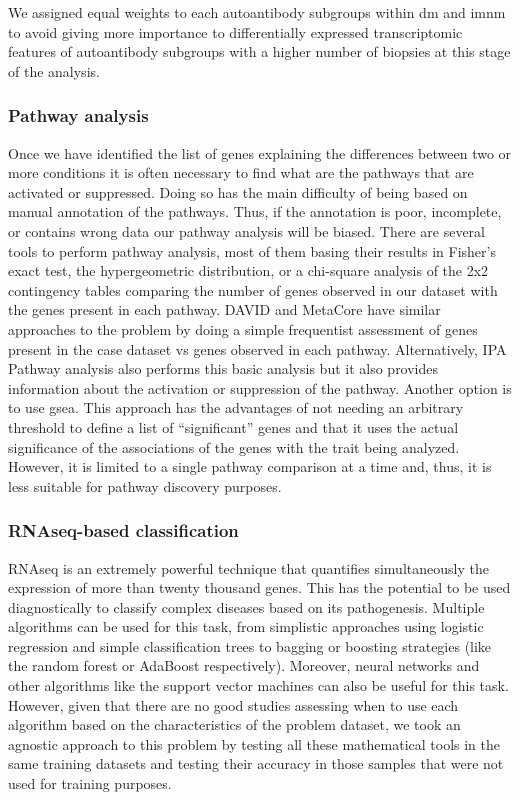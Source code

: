 We assigned equal weights to each autoantibody subgroups within \gls{dm} and  \gls{imnm} to avoid giving more importance to differentially expressed transcriptomic features of autoantibody subgroups with a higher number of biopsies at this stage of the analysis.

\subsubsection{Pathway analysis}
Once we have identified the list of genes explaining the differences between two or more conditions it is often necessary to find what are the pathways that are activated or suppressed. Doing so has the main difficulty of being based on manual annotation of the pathways. Thus, if the annotation is poor, incomplete, or contains wrong data our pathway analysis will be biased. There are several tools to perform pathway analysis, most of them basing their results in Fisher’s exact test, the hypergeometric distribution, or a chi-square analysis of the 2x2 contingency tables comparing the number of genes observed in our dataset with the genes present in each pathway. DAVID and MetaCore have similar approaches to the problem by doing a simple frequentist assessment of genes present in the case dataset vs genes observed in each pathway. Alternatively, IPA Pathway analysis also performs this basic analysis but it also provides information about the activation or suppression of the pathway. Another option is to use \gls{gsea}. This approach has the advantages of not needing an arbitrary threshold to define a list of “significant” genes and that it uses the actual significance of the associations of the genes with the trait being analyzed. However, it is limited to a single pathway comparison at a time and, thus, it is less suitable for pathway discovery purposes.

\subsubsection{RNAseq-based classification}
RNAseq is an extremely powerful technique that quantifies simultaneously the expression of more than twenty thousand genes. This has the potential to be used diagnostically to classify complex diseases based on its pathogenesis. Multiple algorithms can be used for this task, from simplistic approaches using logistic regression and simple classification trees to bagging or boosting strategies (like the random forest or AdaBoost respectively). Moreover, neural networks and other algorithms like the support vector machines can also be useful for this task. However, given that there are no good studies assessing when to use each algorithm based on the characteristics of the problem dataset, we took an agnostic approach to this problem by testing all these mathematical tools in the same training datasets and testing their accuracy in those samples that were not used for training purposes.

